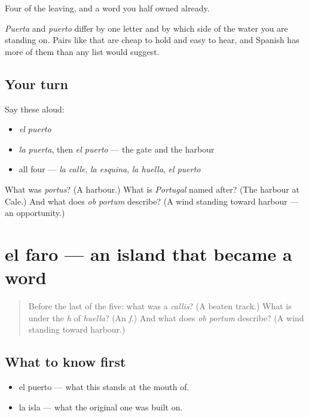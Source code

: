 \begin{grammarlens}[title={What you've built}]
Four of the leaving, and a word you half owned already.

\emph{Puerta} and \emph{puerto} differ by one letter and by which side of the water you are standing on. Pairs like that are cheap to hold and easy to hear, and Spanish has more of them than any list would suggest.
\end{grammarlens}

\subsection*{Your turn}
Say these aloud:

\begin{itemize}
\raggedright
  \item \emph{el puerto}
  \item \emph{la puerta}, then \emph{el puerto} — the gate and the harbour
  \item all four — \emph{la calle}, \emph{la esquina}, \emph{la huella}, \emph{el puerto}
\end{itemize}

\begin{tcolorbox}[breakable,colback=teal!4,colframe=teal!35!black,title={Before you move on}]
What was \emph{portus}? (A harbour.) What is \emph{Portugal} named after? (The harbour at Cale.) And what does \emph{ob portum} describe? (A wind standing toward harbour — an opportunity.)
\end{tcolorbox}
\section[el faro]{el faro — an island that became a word}

\label{lesson:ES-C302-faro}



\begin{quote}
Before the last of the five: what was a \emph{callis}? (A beaten track.) What is under the \emph{h} of \emph{huella}? (An \emph{f}.) And what does \emph{ob portum} describe? (A wind standing toward harbour.)
\end{quote}

\subsection*{What to know first}
\begin{itemize}
\raggedright
  \item el puerto — what this stands at the mouth of.
  \item la isla — what the original one was built on.
\end{itemize}

